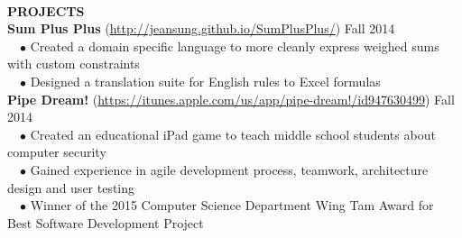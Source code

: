 \documentclass[11.5pt]{article}
\newcommand{\wrapTitle}[1]{{\sectionNL \textbf{\Large #1}} \sectionNL}
\newcommand{\sectionNL}{~\\[1pt]}
\newcommand{\customtab}{$\hspace{10pt} \bullet \hspace{2pt}$}
\newcommand{\JudgeNudge}{\hspace{4pt}}
\newcommand{\rightAlign}{\hfill}
\begin{document}
\begin{flushleft}
\wrapTitle{PROJECTS}
\textbf{Sum Plus Plus} (\url{http://jeansung.github.io/SumPlusPlus/}) \rightAlign Fall 2014 \\
\customtab Created a domain specific language to more cleanly express weighed sums with custom constraints \\
\customtab Designed a translation suite for English rules to Excel formulas \\

\textbf{Pipe Dream!} (\url{https://itunes.apple.com/us/app/pipe-dream!/id947630499})  \rightAlign Fall 2014 \\
\customtab Created an educational iPad game to teach middle school students about computer security\\
\customtab Gained experience in agile development process, teamwork, architecture design and user testing \\
\customtab Winner of the 2015 Computer Science Department Wing Tam Award for Best Software Development Project 
 


\end{flushleft}
\end{document}
